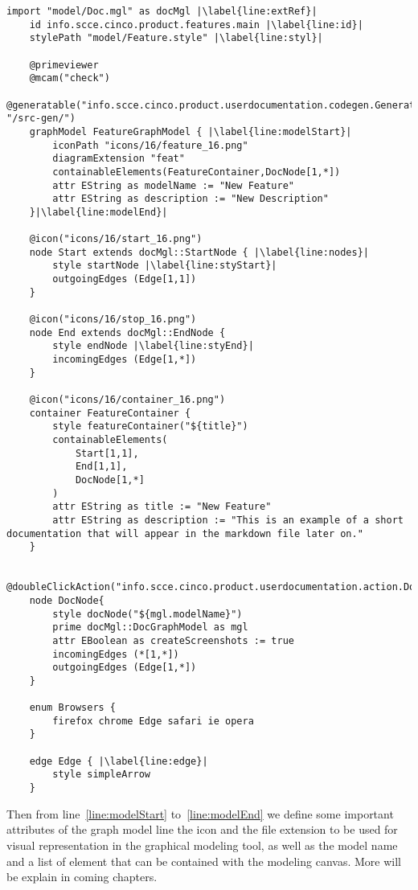 \begin{lstlisting}[language=MGL, caption={Doc.mgl for the user sequence graph model}, label=docMGL, escapechar=|, name=DocMGL]
    import "model/Doc.mgl" as docMgl |\label{line:extRef}|
    id info.scce.cinco.product.features.main |\label{line:id}|
    stylePath "model/Feature.style" |\label{line:styl}|

    @primeviewer
    @mcam("check")
    @generatable("info.scce.cinco.product.userdocumentation.codegen.Generate", "/src-gen/")
    graphModel FeatureGraphModel { |\label{line:modelStart}|
        iconPath "icons/16/feature_16.png"
        diagramExtension "feat"
        containableElements(FeatureContainer,DocNode[1,*])
        attr EString as modelName := "New Feature"
        attr EString as description := "New Description"
    }|\label{line:modelEnd}|

    @icon("icons/16/start_16.png")
    node Start extends docMgl::StartNode { |\label{line:nodes}|
        style startNode |\label{line:styStart}|
        outgoingEdges (Edge[1,1])
    }

    @icon("icons/16/stop_16.png")
    node End extends docMgl::EndNode {
        style endNode |\label{line:styEnd}|
        incomingEdges (Edge[1,*])
    }

    @icon("icons/16/container_16.png")
    container FeatureContainer {
        style featureContainer("${title}")
        containableElements(
            Start[1,1],
            End[1,1],
            DocNode[1,*]
        )
        attr EString as title := "New Feature"
        attr EString as description := "This is an example of a short documentation that will appear in the markdown file later on."
    }
    
    @doubleClickAction("info.scce.cinco.product.userdocumentation.action.DocNodeOpenSubmodel")
    node DocNode{
        style docNode("${mgl.modelName}")
        prime docMgl::DocGraphModel as mgl
        attr EBoolean as createScreenshots := true
        incomingEdges (*[1,*])
        outgoingEdges (Edge[1,*])
    }

    enum Browsers {
        firefox chrome Edge safari ie opera
    }

    edge Edge { |\label{line:edge}|
        style simpleArrow
    }
\end{lstlisting}

Then from line~\ref{line:modelStart} to~\ref{line:modelEnd} we define some important attributes of the graph model line the icon and the file extension to be used for visual representation in the graphical modeling tool, as well as the model name and a list of element that can be contained with the modeling canvas. More will be explain in coming chapters.


